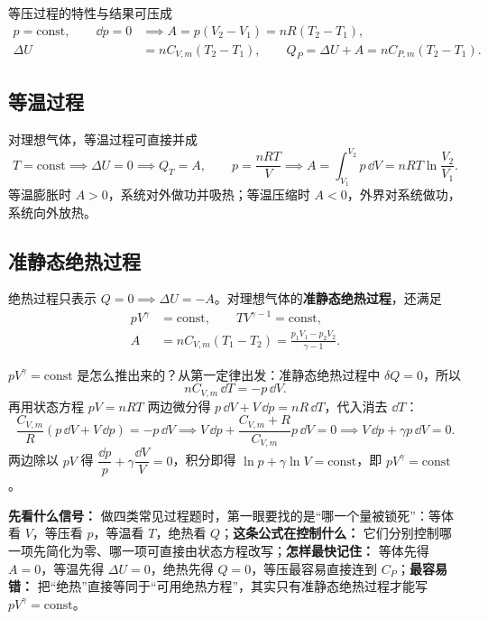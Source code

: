 \documentclass[lang=cn,11pt]{elegantbook}
\begin{document}
等压过程的特性与结果可压成
\begin{align*}
p=\text{const},\qquad \dd p=0
&\implies A=p(V_2-V_1)=nR(T_2-T_1),\\
\Delta U&=nC_{V,m}(T_2-T_1),\qquad
Q_P=\Delta U+A=nC_{P,m}(T_2-T_1).
\end{align*}

\subsection{等温过程}

对理想气体，等温过程可直接并成
\[
T=\text{const}
\implies \Delta U=0
\implies Q_T=A,\qquad
p=\frac{nRT}{V}
\implies A=\int_{V_1}^{V_2}p\,\dd V=nRT\ln\frac{V_2}{V_1}.
\]
等温膨胀时 \(A>0\)，系统对外做功并吸热；等温压缩时 \(A<0\)，外界对系统做功，系统向外放热。

\subsection{准静态绝热过程}

绝热过程只表示 \(Q=0\implies \Delta U=-A\)。对理想气体的\textbf{准静态绝热过程}，还满足
\[
\begin{aligned}
pV^\gamma&=\text{const},\qquad TV^{\gamma-1}=\text{const},\\
A&=nC_{V,m}(T_1-T_2)=\frac{p_1V_1-p_2V_2}{\gamma-1}.
\end{aligned}
\]

\begin{remark}
\(pV^\gamma=\text{const}\) 是怎么推出来的？从第一定律出发：准静态绝热过程中 \(\delta Q=0\)，所以
\[
nC_{V,m}\,\dd T=-p\,\dd V.
\]
再用状态方程 \(pV=nRT\) 两边微分得 \(p\,\dd V+V\,\dd p=nR\,\dd T\)，代入消去 \(\dd T\)：
\[
\frac{C_{V,m}}{R}(p\,\dd V+V\,\dd p)=-p\,\dd V
\implies V\,\dd p+\frac{C_{V,m}+R}{C_{V,m}}p\,\dd V=0
\implies V\,\dd p+\gamma p\,\dd V=0.
\]
两边除以 \(pV\) 得 \(\dfrac{\dd p}{p}+\gamma\dfrac{\dd V}{V}=0\)，积分即得 \(\ln p+\gamma\ln V=\text{const}\)，即 \(pV^\gamma=\text{const}\)。
\end{remark}

\begin{note}
\textbf{先看什么信号：} 做四类常见过程题时，第一眼要找的是“哪一个量被锁死”：等体看 \(V\)，等压看 \(p\)，等温看 \(T\)，绝热看 \(Q\)；\textbf{这条公式在控制什么：} 它们分别控制哪一项先简化为零、哪一项可直接由状态方程改写；\textbf{怎样最快记住：} 等体先得 \(A=0\)，等温先得 \(\Delta U=0\)，绝热先得 \(Q=0\)，等压最容易直接连到 \(C_P\)；\textbf{最容易错：} 把“绝热”直接等同于“可用绝热方程”，其实只有准静态绝热过程才能写 \(pV^\gamma=\text{const}\)。
\end{note}
\end{document}

